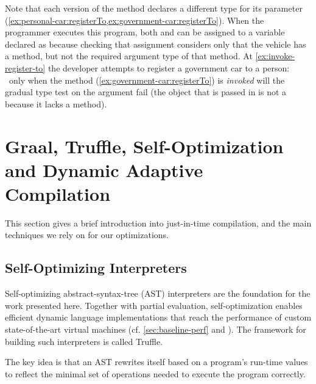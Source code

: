 Note that each version of the  method
declares a different type for its parameter
(\cref{ex:personal-car:registerTo,ex:government-car:registerTo}).
%
When the programmer executes this program,
both  and  can be assigned to
a variable declared as  because checking that assignment considers only that the vehicle has
a  method, but not the required argument type of that
method.
%
At \cref{ex:invoke-register-to} the developer
attempts to register a government car to a person:%
~only when the method (\cref{ex:government-car:registerTo}) is \emph{invoked}
will the gradual type test on the argument fail
(the object that is passed in is not a  because it lacks a
 method).

\section{Graal, Truffle, Self-Optimization and Dynamic Adaptive Compilation}
\label{sec:background-implementation}

This section gives a brief introduction into just-in-time compilation,
and the main techniques we rely on for our optimizations.

\subsection{Self-Optimizing Interpreters}
\label{sec:background-self-opt}

Self-optimizing abstract-syntax-tree (AST) interpreters\citep{Wurthinger:2012:SelfOptAST}
are the foundation for the work presented here.
Together with partial evaluation\citep{Wurthinger:2017:PPE},
self-optimization enables efficient dynamic language implementations
that reach the performance of custom state-of-the-art virtual machines
(cf. \cref{sec:baseline-perf} and \citep{Marr:2015:MTPE}).
The framework for building such interpreters is called Truffle.

The key idea is that an AST rewrites itself based on a program's run-time values
to reflect the minimal set of operations needed to execute the program correctly.

